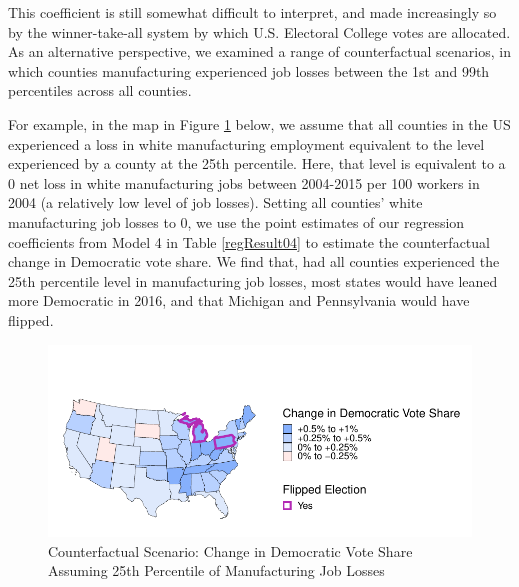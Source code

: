 \documentclass[]{AEA}
\begin{document}
This coefficient is still somewhat difficult to interpret, and made
increasingly so by the winner-take-all system by which U.S. Electoral
College votes are allocated. As an alternative perspective, we examined
a range of counterfactual scenarios, in which counties manufacturing
experienced job losses between the 1st and 99th percentiles across all
counties.

For example, in the map in Figure \ref{counterfactual1} below, we assume
that all counties in the US experienced a loss in white manufacturing
employment equivalent to the level experienced by a county at the 25th
percentile. Here, that level is equivalent to a 0 net loss in white
manufacturing jobs between 2004-2015 per 100 workers in 2004 (a
relatively low level of job losses). Setting all counties' white
manufacturing job losses to 0, we use the point estimates of our
regression coefficients from Model 4 in Table \ref{regResult04} to
estimate the counterfactual change in Democratic vote share. We find
that, had all counties experienced the 25th percentile level in
manufacturing job losses, most states would have leaned more Democratic
in 2016, and that Michigan and Pennsylvania would have flipped.

\FloatBarrier
\begin{figure} 
\caption{Counterfactual Scenario: Change in Democratic Vote Share Assuming 25th Percentile of Manufacturing Job Losses}
\label{counterfactual1}

\begin{center}\includegraphics{Final-Draft_files/figure-latex/unnamed-chunk-6-1} \end{center}



\FloatBarrier
\end{figure}
\FloatBarrier
\end{document}
